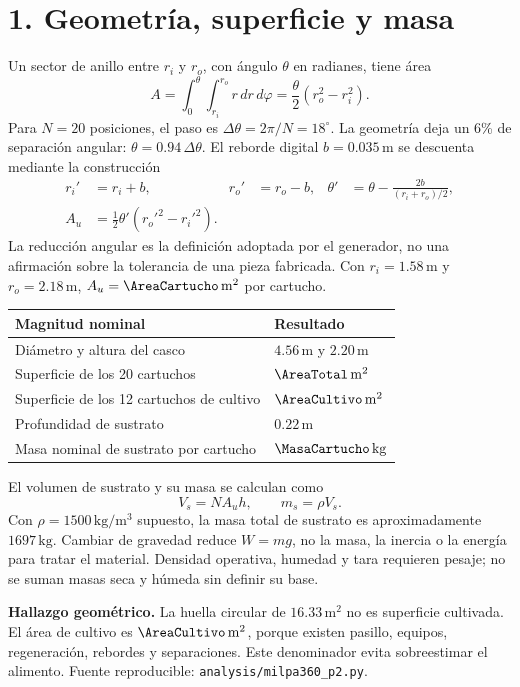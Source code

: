 \documentclass[11pt,a4paper]{article}
\begin{document}
\section*{1. Geometría, superficie y masa}
Un sector de anillo entre $r_i$ y $r_o$, con ángulo $\theta$ en radianes, tiene área
\begin{equation}
 A=\int_0^\theta\int_{r_i}^{r_o}r\,dr\,d\varphi
 =\frac{\theta}{2}(r_o^2-r_i^2).
\end{equation}
Para $N=20$ posiciones, el paso es $\Delta\theta=2\pi/N=18^\circ$.
La geometría deja un 6\% de separación angular: $\theta=0.94\,\Delta\theta$.
El reborde digital $b=0.035\,\mathrm{m}$ se descuenta mediante la construcción
\begin{align}
 r_i'&=r_i+b, &r_o'&=r_o-b, &\theta'&=\theta-\frac{2b}{(r_i+r_o)/2},\\
 A_u&=\tfrac12\theta'({r_o'}^2-{r_i'}^2).
\end{align}
La reducción angular es la definición adoptada por el generador, no una afirmación
sobre la tolerancia de una pieza fabricada. Con $r_i=1.58\,\mathrm m$ y
$r_o=2.18\,\mathrm m$, $A_u=\AreaCartucho\,\mathrm{m^2}$ por cartucho.
\begin{center}\begin{tabular}{ll}\toprule
Magnitud nominal & Resultado\\\midrule
Diámetro y altura del casco & $4.56\,\mathrm m$ y $2.20\,\mathrm m$\\
Superficie de los 20 cartuchos & $\AreaTotal\,\mathrm{m^2}$\\
Superficie de los 12 cartuchos de cultivo & $\AreaCultivo\,\mathrm{m^2}$\\
Profundidad de sustrato & $0.22\,\mathrm m$\\
Masa nominal de sustrato por cartucho & $\MasaCartucho\,\mathrm{kg}$\\\bottomrule
\end{tabular}\end{center}
El volumen de sustrato y su masa se calculan como
\begin{equation} V_s=N A_u h,\qquad m_s=\rho V_s.\end{equation}
Con $\rho=1500\,\mathrm{kg/m^3}$ supuesto, la masa total de sustrato es
aproximadamente $1697\,\mathrm{kg}$. Cambiar de gravedad reduce $W=mg$, no la masa,
la inercia o la energía para tratar el material. Densidad operativa, humedad y tara
requieren pesaje; no se suman masas seca y húmeda sin definir su base.

\textbf{Hallazgo geométrico.} La huella circular de $16.33\,\mathrm{m^2}$ no es superficie
cultivada. El área de cultivo es $\AreaCultivo\,\mathrm{m^2}$, porque existen pasillo,
equipos, regeneración, rebordes y separaciones. Este denominador evita sobreestimar
el alimento. Fuente reproducible: \texttt{analysis/milpa360\_p2.py}.
\end{document}
